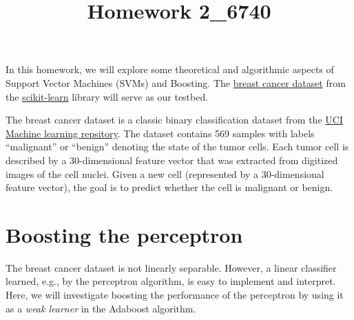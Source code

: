 \documentclass[12pt]{article}
\title{Homework 2_6740}
\begin{document}
\MakeScribeTop

In this homework, we will explore some theoretical and algorithmic aspects of Support Vector Machines (SVMs) and Boosting. The  \href{https://scikit-learn.org/stable/modules/generated/sklearn.datasets.load_breast_cancer.html}{breast cancer dataset} from the \href{https://scikit-learn.org/stable/modules/generated/sklearn.datasets.load_breast_cancer.html}{scikit-learn} library will serve as our testbed.

The breast cancer dataset is a classic binary classification dataset from the \href{https://archive.ics.uci.edu/dataset/17/breast+cancer+wisconsin+diagnostic}{UCI Machine learning repsitory}. The dataset contains 569 samples with labels ``malignant'' or ``benign'' denoting the state of the tumor cells. Each tumor cell is described by a 30-dimensional feature vector that was extracted from digitized images of the cell nuclei. Given a new cell (represented by a 30-dimensional feature vector), the goal is to predict whether the cell is malignant or benign.


\section{Boosting the perceptron}
The breast cancer dataset is not linearly separable. However, a linear classifier learned, e.g., by the perceptron algorithm, is easy to implement and interpret. Here, we will investigate boosting the performance of the perceptron by using it as a \emph{weak learner} in the Adaboost algorithm.
\end{document}

